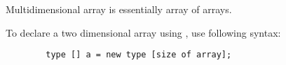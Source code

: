 \documentclass[../main.tex]{subfiles}
\begin{document}
    Multidimensional array is essentially array of arrays.

    To declare a two dimensional array using \csharp, use following syntax:
    \begin{verbatim}
        type [] a = new type [size of array];
    \end{verbatim}

    
\end{document}
